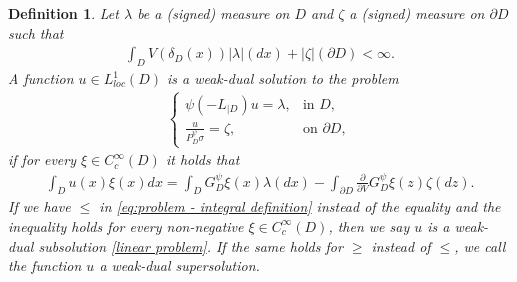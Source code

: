 \documentclass[12pt,a4paper,onecolumn]{article}
\newtheorem{defn}[thm]{Definition}
\theoremstyle{definition}
\newcommand{\1}{\mathbf 1}
\newcommand{\de}{\delta_D}
\newcommand{\Lo}{\psi(-L_{|D})}
\newcommand{\GDP}{G_D^\psi}
\newcommand{\PDS}{P^{\psi}_{ D}}
\numberwithin{equation}{section}
\begin{document}
	\begin{defn}\label{d:problem definition}
		Let $\lambda$ be a (signed) measure on $D$ and $\zeta$ a (signed) measure on $\partial D$ such that  
		\begin{align}\label{eq:condition on rate of solution}
			\int_DV(\de(x))|\lambda|(dx)+|\zeta|(\partial D)<\infty.\tag{$I_V$}
		\end{align}
        A function $u\in L^1_{loc}(D)$ is a weak-dual solution to the problem
		\begin{align}\label{linear problem}
			\begin{cases}
				\Lo u=\lambda,&\textrm{in $D$},\\
				\frac{u}{\PDS\sigma}=\zeta,&\textrm{on $\partial D$},
			\end{cases}
		\end{align}
		if for every $\xi\in C_c^\infty(D)$ it holds that
		\begin{align}\label{eq:problem - integral definition}
			\int_D u(x)\xi(x)dx=\int_D\GDP\xi(x)\lambda(dx)-\int_{\partial D}\frac{\partial}{\partial V}\GDP\xi(z)\zeta(dz).
		\end{align}
		If we have $\le$ in \eqref{eq:problem - integral definition} instead of the equality and the inequality holds for every non-negative $\xi\in C_c^\infty(D)$, then we say $u$ is a weak-dual subsolution \eqref{linear problem}. If the same holds for $\ge$ instead of $\le$, we call the function $u$ a weak-dual supersolution.	\end{defn}
	
\end{document}
